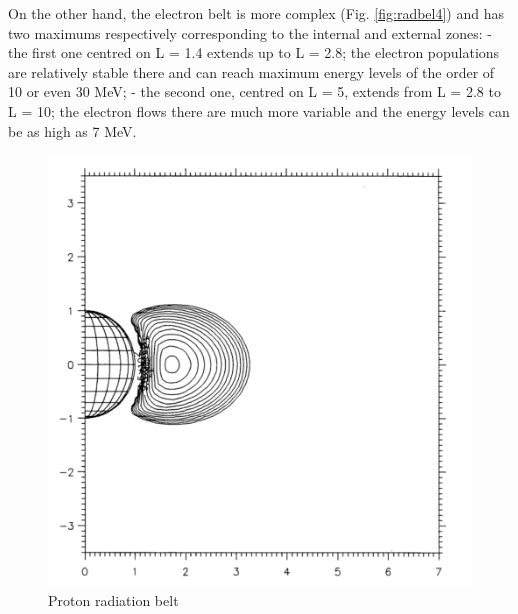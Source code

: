 \documentclass[./dissertation.tex]{subfiles}
\begin{document}
On the other hand, the electron belt is more complex (Fig. \ref{fig:radbel4}) and has two
maximums respectively corresponding to the internal and
external zones:
- the first one centred on L = 1.4 extends up to L = 2.8; the
electron populations are relatively stable there and can reach
maximum energy levels of the order of 10 or even 30 MeV;
- the second one, centred on L = 5, extends from L = 2.8 to
L = 10; the electron flows there are much more variable and
the energy levels can be as high as 7 MeV.

\begin{figure}[h!]
\centering
  \includegraphics[scale = 0.50]{imgs/radbelt3.png}
  \caption{Proton radiation belt \cite{bib2}}
  \label{fig:radbel3}
\end{figure}
\end{document}

